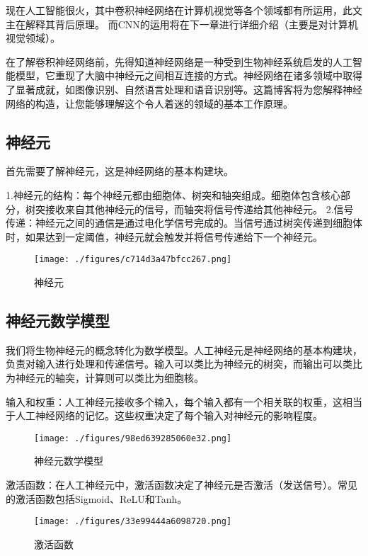 现在人工智能很火，其中卷积神经网络在计算机视觉等各个领域都有所运用，此文主在解释其背后原理。
而CNN的运用将在下一章进行详细介绍（主要是对计算机视觉领域）。

在了解卷积神经网络前，先得知道神经网络是一种受到生物神经系统启发的人工智能模型，它重现了大脑中神经元之间相互连接的方式。神经网络在诸多领域中取得了显著成就，如图像识别、自然语言处理和语音识别等。这篇博客将为您解释神经网络的构造，让您能够理解这个令人着迷的领域的基本工作原理。
\subsection{神经元 }
首先需要了解神经元，这是神经网络的基本构建块。

1.神经元的结构：每个神经元都由细胞体、树突和轴突组成。细胞体包含核心部分，树突接收来自其他神经元的信号，而轴突将信号传递给其他神经元。
2.信号传递：神经元之间的通信是通过电化学信号完成的。当信号通过树突传递到细胞体时，如果达到一定阈值，神经元就会触发并将信号传递给下一个神经元。
\begin{figure}[ht]
\centering
\texttt{[image: ./figures/c714d3a47bfcc267.png]}
\caption{神经元} \label{fig_CNN1_1}
\end{figure}

\subsection{神经元数学模型 }
我们将生物神经元的概念转化为数学模型。人工神经元是神经网络的基本构建块，负责对输入进行处理和传递信号。输入可以类比为神经元的树突，而输出可以类比为神经元的轴突，计算则可以类比为细胞核。

输入和权重：人工神经元接收多个输入，每个输入都有一个相关联的权重，这相当于人工神经网络的记忆。这些权重决定了每个输入对神经元的影响程度。\begin{figure}[ht]
\centering
\texttt{[image: ./figures/98ed639285060e32.png]}
\caption{神经元数学模型} \label{fig_CNN1_2}
\end{figure}
激活函数：在人工神经元中，激活函数决定了神经元是否激活（发送信号）。常见的激活函数包括Sigmoid、ReLU和Tanh。
\begin{figure}[ht]
\centering
\texttt{[image: ./figures/33e99444a6098720.png]}
\caption{激活函数} \label{fig_CNN1_3}
\end{figure}

